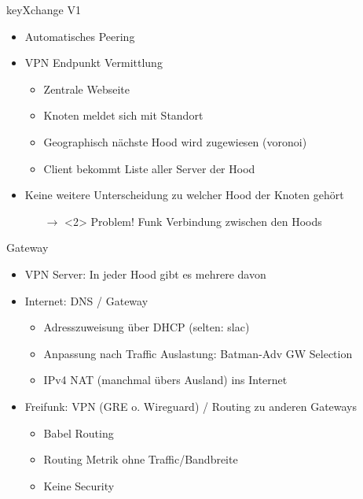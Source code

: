 \begin{frame}{keyXchange V1}
    \begin{itemize}
        \item \glqq{}Automatisches Peering\grqq{}
        \item VPN Endpunkt Vermittlung
        \begin{itemize}
            \item Zentrale Webseite 
            \item Knoten meldet sich mit Standort
            \item Geographisch nächste Hood wird zugewiesen (voronoi)
            \item Client bekommt Liste aller Server der Hood
        \end{itemize}
        \item Keine weitere Unterscheidung zu welcher Hood der Knoten gehört
        \begin{itemize}
            \item[$\rightarrow$]<2> {\color{red}Problem!} Funk Verbindung zwischen den Hoods
        \end{itemize}
    \end{itemize}
\end{frame}

\begin{frame}{Gateway}
    \begin{itemize}
        \item VPN Server: In jeder Hood gibt es mehrere davon
        \item Internet: DNS / Gateway
        \begin{itemize}
            \item Adresszuweisung über DHCP (selten: slac)
            \item Anpassung nach Traffic Auslastung: Batman-Adv GW Selection
            \item IPv4 NAT (manchmal übers Ausland) ins Internet
        \end{itemize}
        \item Freifunk: VPN (GRE o. Wireguard) / Routing zu anderen Gateways
        \begin{itemize}
            \item Babel Routing
            \item Routing Metrik ohne Traffic/Bandbreite
            \item Keine Security
        \end{itemize}
    \end{itemize}
\end{frame}
